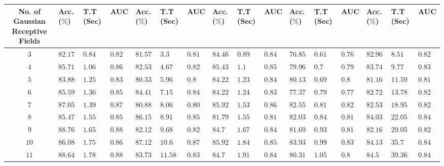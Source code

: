 \begin{table}
{\begin{tabular}{clllllllllllllll}
			\midrule
			No. of Gaussian Receptive Fields & Acc. ($\%$) & T.T (Sec) & AUC  & Acc. ($\%$)  & T.T (Sec)  & AUC  & Acc. ($\%$) & T.T (Sec) & AUC  & Acc. ($\%$) & T.T (Sec) & AUC  & Acc. ($\%$) & T.T (Sec) & AUC  \\
			\midrule
			$3$                                & $82.17$     & $0.84$      & $0.82$ & $81.57$      & $3.3$        & $0.81$ & $84.46$     & $0.89$      & $0.84$ & $76.85$     & $0.61$      & $0.76$ & $82.96$     & $8.51$      & $0.82$ \\
			$4$                                & $85.71$     & $1.06$      & $0.86$ & $82.53$      & $4.67$       & $0.82$ & $85.43$     & $1.1$       & $0.85$ & $79.96$     & $0.7$       & $0.79$ & $83.74$     & $9.77$      & $0.83$ \\
			$5$                                & $83.88$     & $1.25$      & $0.83$ & $80.33$      & $5.96$       & $0.8$  & $84.22$     & $1.23$      & $0.84$ & $80.13$     & $0.69$      & $0.8$  & $81.16$     & $11.59$     & $0.81$ \\
			$6$                                & $85.59$     & $1.36$      & $0.85$ & $84.41$      & $7.15$       & $0.84$ & $84.22$     & $1.24$      & $0.83$ & $77.37$     & $0.79$      & $0.77$ & $82.72$     & $13.78$     & $0.82$ \\
			$7$                                & $87.05$     & $1.39$      & $0.87$ & $80.88$      & $8.06$       & $0.80$  & $\mathbf{85.92}$     & $\mathbf{1.53}$      & $\mathbf{0.86}$ & $82.55$     & $0.81$      & $0.82$ & $82.53$     & $18.95$     & $0.82$ \\
			$8$                                & $85.47$     & $1.55$      & $0.85$ & $86.15$      & $8.91$       & $0.85$ & $81.79$     & $1.55$      & $0.81$ & $82.03$     & $0.84$      & $0.81$ & $84.03$     & $22.05$     & $0.84$ \\
			$9$  & $\mathbf{88.76}$     & $\mathbf{1.65}$      & $\mathbf{0.88}$ & $82.12$      & $9.68$       & $0.82$ & $84.7$      & $1.67$      & $0.84$ & $81.69$     & $0.93$      & $0.81$ & $82.16$     & $29.05$     & $0.82$ \\
			$10$                               & $86.08$     & $1.75$      & $0.86$ & $\mathbf{87.12}$      & $\mathbf{10.6}$       & $\mathbf{0.87}$ & $85.92$     & $1.84$      & $0.85$ & $83.93$     & $0.99$      & $0.83$ & $84.13$     & $35.7$      & $0.84$ \\
			$11$                               & $88.64$     & $1.78$      & $0.88$ & $83.73$      & $11.58$      & $0.83$ & $84.7$      & $1.91$     & $0.84$ & $80.31$     & $1.05$      & $0.8$  & $84.5$      & $39.36$     & $0.84$ \\

\end{tabular}}
\end{table}
